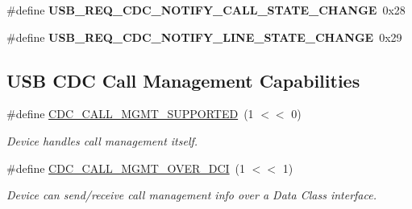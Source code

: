 \begin{DoxyCompactItemize}
\item 
\hypertarget{group__cdc__protocol__group_gafa88febd1fa012a2546955f369dda31a}{\#define {\bfseries U\-S\-B\-\_\-\-R\-E\-Q\-\_\-\-C\-D\-C\-\_\-\-N\-O\-T\-I\-F\-Y\-\_\-\-C\-A\-L\-L\-\_\-\-S\-T\-A\-T\-E\-\_\-\-C\-H\-A\-N\-G\-E}~0x28}\label{group__cdc__protocol__group_gafa88febd1fa012a2546955f369dda31a}

\item 
\hypertarget{group__cdc__protocol__group_ga56a8138659ffd7322ba8be458deacb85}{\#define {\bfseries U\-S\-B\-\_\-\-R\-E\-Q\-\_\-\-C\-D\-C\-\_\-\-N\-O\-T\-I\-F\-Y\-\_\-\-L\-I\-N\-E\-\_\-\-S\-T\-A\-T\-E\-\_\-\-C\-H\-A\-N\-G\-E}~0x29}\label{group__cdc__protocol__group_ga56a8138659ffd7322ba8be458deacb85}

\end{DoxyCompactItemize}
\subsection*{U\-S\-B C\-D\-C Call Management Capabilities}
\begin{DoxyCompactItemize}
\item 
\hypertarget{group__cdc__protocol__group_gadba5c50400705310683bce4604525634}{\#define \hyperlink{group__cdc__protocol__group_gadba5c50400705310683bce4604525634}{C\-D\-C\-\_\-\-C\-A\-L\-L\-\_\-\-M\-G\-M\-T\-\_\-\-S\-U\-P\-P\-O\-R\-T\-E\-D}~(1 $<$$<$ 0)}\label{group__cdc__protocol__group_gadba5c50400705310683bce4604525634}

\begin{DoxyCompactList}\small\item\em Device handles call management itself. \end{DoxyCompactList}\item 
\hypertarget{group__cdc__protocol__group_ga84beb2dffd6b294aed339d1dcf4dadf2}{\#define \hyperlink{group__cdc__protocol__group_ga84beb2dffd6b294aed339d1dcf4dadf2}{C\-D\-C\-\_\-\-C\-A\-L\-L\-\_\-\-M\-G\-M\-T\-\_\-\-O\-V\-E\-R\-\_\-\-D\-C\-I}~(1 $<$$<$ 1)}\label{group__cdc__protocol__group_ga84beb2dffd6b294aed339d1dcf4dadf2}

\begin{DoxyCompactList}\small\item\em Device can send/receive call management info over a Data Class interface. \end{DoxyCompactList}\end{DoxyCompactItemize}
